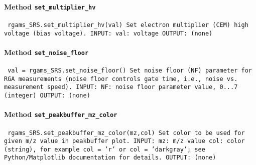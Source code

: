 \paragraph{Method \texttt{set_multiplier_hv}}
\vspace{1ex}
\texttt{\newline
rgams_SRS.set_multiplier_hv(val)\newline
\newline
Set electron multiplier (CEM) high voltage (bias voltage).\newline
\newline
INPUT:\newline
val: voltage\newline
\newline
OUTPUT:\newline
(none)\newline
\newline
}

\paragraph{Method \texttt{set_noise_floor}}
\vspace{1ex}
\texttt{\newline
val = rgams_SRS.set_noise_floor()\newline
\newline
Set noise floor (NF) parameter for RGA measurements (noise floor controls gate time, i.e., noise vs. measurement speed).\newline
\newline
INPUT:\newline
NF: noise floor parameter value, 0...7 (integer)\newline
\newline
OUTPUT:\newline
(none)\newline
\newline
}

\paragraph{Method \texttt{set_peakbuffer_mz_color}}
\vspace{1ex}
\texttt{\newline
rgams_SRS.set_peakbuffer_mz_color(mz,col)\newline
\newline
Set color to be used for given m/z value in peakbuffer plot.\newline
\newline
INPUT:\newline
mz: m/z value\newline
col: color (string), for example col = 'r' or col = 'darkgray'; see Python/Matplotlib documentation for details.\newline
\newline
OUTPUT:\newline
(none)\newline
\newline
}

